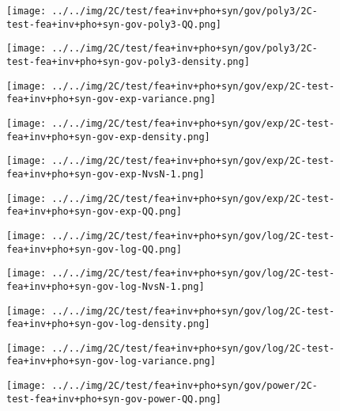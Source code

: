 \begin{figure}[H]
\centering	\texttt{[image: ../../img/2C/test/fea+inv+pho+syn/gov/poly3/2C-test-fea+inv+pho+syn-gov-poly3-QQ.png]}
\end{figure}
\begin{figure}[H]
\centering	\texttt{[image: ../../img/2C/test/fea+inv+pho+syn/gov/poly3/2C-test-fea+inv+pho+syn-gov-poly3-density.png]}
\end{figure}
\begin{figure}[H]
\centering	\texttt{[image: ../../img/2C/test/fea+inv+pho+syn/gov/exp/2C-test-fea+inv+pho+syn-gov-exp-variance.png]}
\end{figure}
\begin{figure}[H]
\centering	\texttt{[image: ../../img/2C/test/fea+inv+pho+syn/gov/exp/2C-test-fea+inv+pho+syn-gov-exp-density.png]}
\end{figure}
\begin{figure}[H]
\centering	\texttt{[image: ../../img/2C/test/fea+inv+pho+syn/gov/exp/2C-test-fea+inv+pho+syn-gov-exp-NvsN-1.png]}
\end{figure}
\begin{figure}[H]
\centering	\texttt{[image: ../../img/2C/test/fea+inv+pho+syn/gov/exp/2C-test-fea+inv+pho+syn-gov-exp-QQ.png]}
\end{figure}
\begin{figure}[H]
\centering	\texttt{[image: ../../img/2C/test/fea+inv+pho+syn/gov/log/2C-test-fea+inv+pho+syn-gov-log-QQ.png]}
\end{figure}
\begin{figure}[H]
\centering	\texttt{[image: ../../img/2C/test/fea+inv+pho+syn/gov/log/2C-test-fea+inv+pho+syn-gov-log-NvsN-1.png]}
\end{figure}
\begin{figure}[H]
\centering	\texttt{[image: ../../img/2C/test/fea+inv+pho+syn/gov/log/2C-test-fea+inv+pho+syn-gov-log-density.png]}
\end{figure}
\begin{figure}[H]
\centering	\texttt{[image: ../../img/2C/test/fea+inv+pho+syn/gov/log/2C-test-fea+inv+pho+syn-gov-log-variance.png]}
\end{figure}
\begin{figure}[H]
\centering	\texttt{[image: ../../img/2C/test/fea+inv+pho+syn/gov/power/2C-test-fea+inv+pho+syn-gov-power-QQ.png]}
\end{figure}
